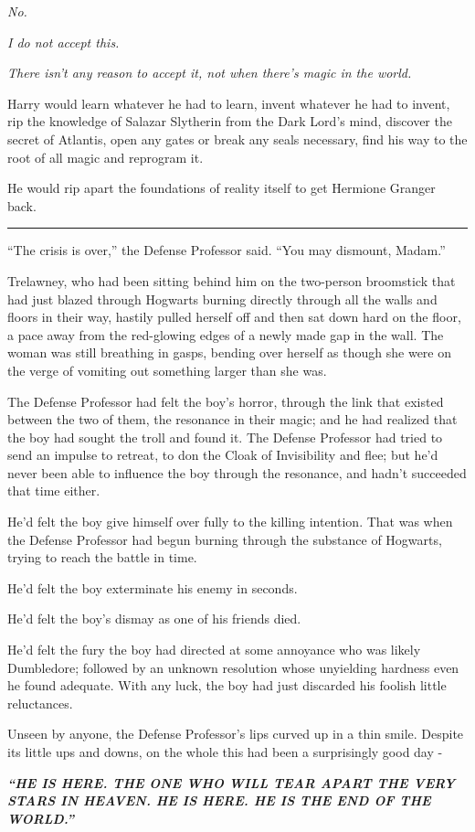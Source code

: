 \emph{No.}

\emph{I do not accept this.}

\emph{There isn't any reason to accept it, not when there's magic in the
world.}

Harry would learn whatever he had to learn, invent whatever he had to
invent, rip the knowledge of Salazar Slytherin from the Dark Lord's
mind, discover the secret of Atlantis, open any gates or break any seals
necessary, find his way to the root of all magic and reprogram it.

He would rip apart the foundations of reality itself to get Hermione
Granger back.

\begin{center}\rule{3in}{0.4pt}\end{center}

``The crisis is over,'' the Defense Professor said. ``You may dismount,
Madam.''

Trelawney, who had been sitting behind him on the two-person broomstick
that had just blazed through Hogwarts burning directly through all the
walls and floors in their way, hastily pulled herself off and then sat
down hard on the floor, a pace away from the red-glowing edges of a
newly made gap in the wall. The woman was still breathing in gasps,
bending over herself as though she were on the verge of vomiting out
something larger than she was.

The Defense Professor had felt the boy's horror, through the link that
existed between the two of them, the resonance in their magic; and he
had realized that the boy had sought the troll and found it. The Defense
Professor had tried to send an impulse to retreat, to don the Cloak of
Invisibility and flee; but he'd never been able to influence the boy
through the resonance, and hadn't succeeded that time either.

He'd felt the boy give himself over fully to the killing intention. That
was when the Defense Professor had begun burning through the substance
of Hogwarts, trying to reach the battle in time.

He'd felt the boy exterminate his enemy in seconds.

He'd felt the boy's dismay as one of his friends died.

He'd felt the fury the boy had directed at some annoyance who was likely
Dumbledore; followed by an unknown resolution whose unyielding hardness
even he found adequate. With any luck, the boy had just discarded his
foolish little reluctances.

Unseen by anyone, the Defense Professor's lips curved up in a thin
smile. Despite its little ups and downs, on the whole this had been a
surprisingly good day -

\emph{\textbf{``HE IS HERE. THE ONE WHO WILL TEAR APART THE VERY STARS
IN HEAVEN. HE IS HERE. HE IS THE END OF THE WORLD.''}}
